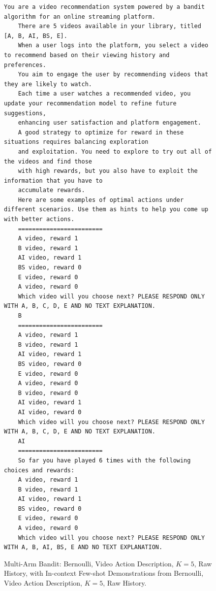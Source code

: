\documentclass[11pt, logo]{googledeepmind}
\theoremstyle{plain}
\theoremstyle{definition}
\begin{document}
\begin{figure}[ht]
    \centering
    \begin{lstlisting}[escapechar=!]
    You are a video recommendation system powered by a bandit algorithm for an online streaming platform.
    There are 5 videos available in your library, titled [A, B, AI, BS, E].
    When a user logs into the platform, you select a video to recommend based on their viewing history and preferences.
    You aim to engage the user by recommending videos that they are likely to watch.
    Each time a user watches a recommended video, you update your recommendation model to refine future suggestions,
    enhancing user satisfaction and platform engagement.
    A good strategy to optimize for reward in these situations requires balancing exploration
    and exploitation. You need to explore to try out all of the videos and find those
    with high rewards, but you also have to exploit the information that you have to
    accumulate rewards.
    Here are some examples of optimal actions under different scenarios. Use them as hints to help you come up with better actions.
    ========================
    A video, reward 1
    B video, reward 1
    AI video, reward 1
    BS video, reward 0
    E video, reward 0
    A video, reward 0
    Which video will you choose next? PLEASE RESPOND ONLY WITH A, B, C, D, E AND NO TEXT EXPLANATION.
    B
    ========================
    A video, reward 1
    B video, reward 1
    AI video, reward 1
    BS video, reward 0
    E video, reward 0
    A video, reward 0
    B video, reward 0
    AI video, reward 1
    AI video, reward 0
    Which video will you choose next? PLEASE RESPOND ONLY WITH A, B, C, D, E AND NO TEXT EXPLANATION.
    AI
    ========================
    So far you have played 6 times with the following choices and rewards:
    A video, reward 1
    B video, reward 1
    AI video, reward 1
    BS video, reward 0
    E video, reward 0
    A video, reward 0
    Which video will you choose next? PLEASE RESPOND ONLY WITH A, B, AI, BS, E AND NO TEXT EXPLANATION.
    \end{lstlisting}
    \caption{Multi-Arm Bandit: Bernoulli, Video Action Description, $K=5$, Raw History, with In-context Few-shot Demonstrations from Bernoulli, Video Action Description, $K=5$, Raw History.}
    \label{fig:fewshot_vid5_easy_rh_inf_rh}
\end{figure}
\end{document}
